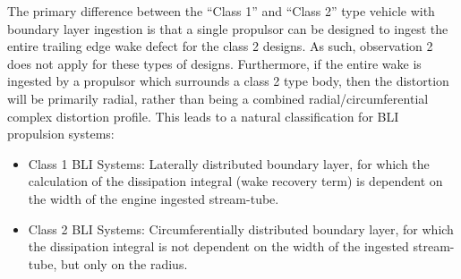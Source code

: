 					The primary difference between the ``Class 1'' and ``Class 2'' type vehicle with boundary layer ingestion is that a single propulsor can be designed to ingest the entire trailing edge wake defect for the class 2 designs.  As such, observation 2 does not apply for these types of designs.  Furthermore, if the entire wake is ingested by a propulsor which surrounds a class 2 type body, then the distortion will be primarily radial, rather than being a combined radial/circumferential complex distortion profile. This leads to a natural classification for BLI propulsion systems:
					
					\begin{itemize}
						\item{Class 1 BLI Systems:  Laterally distributed boundary layer, for which the calculation of the dissipation integral (wake recovery term) is dependent on the width of the engine ingested stream-tube.}
						
						\item{Class 2 BLI Systems:  Circumferentially distributed boundary layer, for which the dissipation integral is not dependent on the width of the ingested stream-tube, but only on the radius.}
					\end{itemize}
					 					
